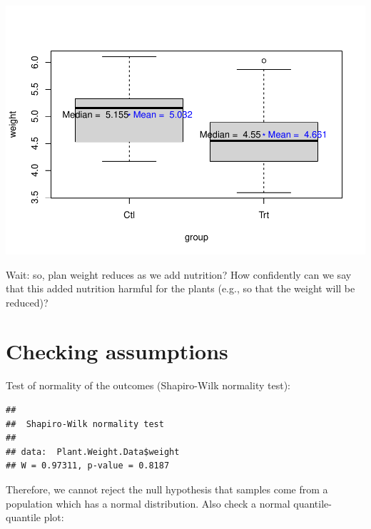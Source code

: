 \documentclass[
]{book}
\newenvironment{Shaded}{\begin{snugshade}}{\end{snugshade}}
\newcommand{\KeywordTok}[1]{\textcolor[rgb]{0.13,0.29,0.53}{\textbf{#1}}}
\newcommand{\NormalTok}[1]{#1}
\newcommand{\OperatorTok}[1]{\textcolor[rgb]{0.81,0.36,0.00}{\textbf{#1}}}
\begin{document}
\includegraphics{SurveyBook_files/figure-latex/rawDataShow2-1.pdf}

Wait: so, plan weight reduces as we add nutrition? How confidently can we say that this added nutrition harmful for the plants (e.g., so that the weight will be reduced)?

\hypertarget{checking-assumptions}{%
\section{Checking assumptions}\label{checking-assumptions}}

Test of normality of the outcomes (Shapiro-Wilk normality test):

\begin{Shaded}
\end{Shaded}

\begin{verbatim}
## 
## 	Shapiro-Wilk normality test
## 
## data:  Plant.Weight.Data$weight
## W = 0.97311, p-value = 0.8187
\end{verbatim}

Therefore, we cannot reject the null hypothesis that samples come from a population which has a normal distribution. Also check a normal quantile-quantile plot:

\begin{Shaded}
\end{Shaded}
\end{document}
